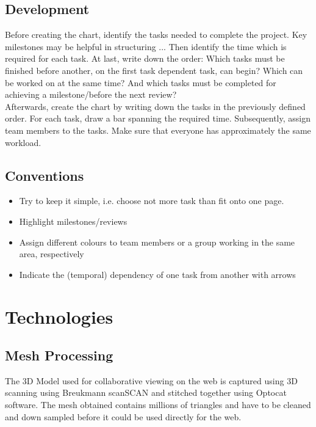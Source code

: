 \documentclass[twoside,12pt,a4paper]{article}
\begin{document}
\subsection{Development} %
\label{sub:development}
Before creating the chart, identify the tasks needed to complete the project. Key milestones may be helpful in structuring ... Then identify the time which is required for each task. At last, write down the order: Which tasks must be finished before another, on the first task dependent task, can begin? Which can be worked on at the same time? And which tasks must be completed for achieving a milestone/before the next review? \\
Afterwards, create the chart by writing down the tasks in the previously defined order. For each task, draw a bar spanning the required time. Subsequently, assign team members to the tasks. Make sure that everyone has approximately the same workload.



\subsection{Conventions} %
\label{sub:conventions}

\begin{itemize}
	\item Try to keep it simple, i.e. choose not more task than fit onto one page.
	\item Highlight milestones/reviews
	\item Assign different colours to team members or a group working in the same area, respectively
	\item Indicate the (temporal) dependency of one task from another with arrows
\end{itemize}




\newpage

\section{Technologies}
\subsection{Mesh Processing} %
\label{sec:Mesh processing}

The 3D Model used for collaborative viewing on the web is captured using 3D scanning using Breukmann scanSCAN and stitched together using Optocat software. The mesh obtained contains millions of triangles and have to be cleaned and down sampled before it could be used directly for the web.
\end{document}
